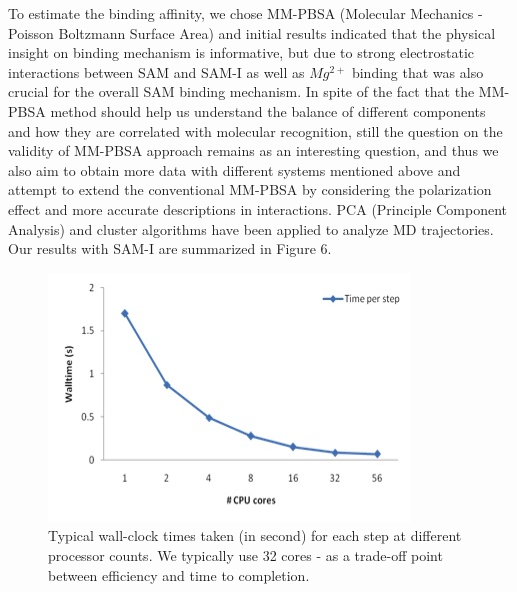 \documentclass[a4paper,10pt]{article}
\begin{document}
To estimate the binding affinity, we chose MM-PBSA (Molecular Mechanics - Poisson Boltzmann Surface Area) and initial results indicated that the physical insight on binding mechanism is informative, but due to strong electrostatic interactions between SAM and SAM-I as well as $Mg^{2+}$ binding that was also crucial for the overall SAM binding mechanism.  In spite of the fact that the MM-PBSA method should help us understand the balance of different components and how they are correlated with molecular recognition, still the question on the validity of MM-PBSA approach remains as an interesting question, and thus we also aim to obtain more data with different systems mentioned above and attempt to extend the conventional MM-PBSA by considering the polarization effect and more accurate descriptions in interactions.  PCA (Principle Component Analysis) and cluster algorithms have been applied to analyze MD trajectories.  Our results with SAM-I are summarized in Figure 6.


\begin{figure}
   \includegraphics[scale=0.660]{56k_scaling-2}
\caption{Typical wall-clock times taken (in second) for each step at different processor counts. We typically use 32 cores - as a trade-off point between efficiency and time to completion. }
\end{figure}
\end{document}
